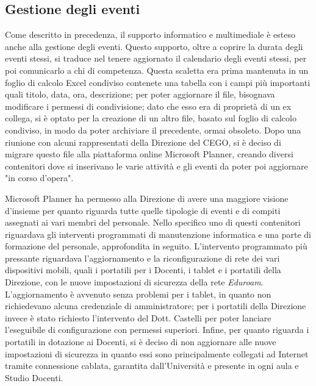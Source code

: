             \subsection{Gestione degli eventi}
                \par
                    Come descritto in precedenza, il supporto informatico e multimediale è esteso anche alla gestione degli eventi. Questo supporto, oltre a coprire la durata degli eventi stessi, si traduce nel tenere aggiornato il calendario degli eventi stessi, per poi comunicarlo a chi di competenza. Questa scaletta era prima mantenuta in un foglio di calcolo Excel condiviso contenete una tabella con i campi più importanti quali titolo, data, ora, descrizione; per poter aggiornare il file, bisognava modificare i permessi di condivisione; dato che esso era di proprietà di un ex collega, si è optato per la creazione di un altro file, basato sul foglio di calcolo condiviso, in modo da poter archiviare il precedente, ormai obsoleto. \newline
                    Dopo una riunione con alcuni rappresentati della Direzione del CEGO, si è deciso di migrare questo file alla piattaforma online Microsoft Planner, creando diversi contenitori dove si inserivano le varie attività e gli eventi da poter poi aggiornare "in corso d'opera".
                \par 
                    Microsoft Planner ha permesso alla Direzione di avere una maggiore visione d'insieme per quanto riguarda tutte quelle tipologie di eventi e di compiti assegnati ai vari membri del personale. Nello specifico uno di questi contenitori riguardava gli interventi programmati di manutenzione informatica e una parte di formazione del personale, approfondita in seguito. 
                    L'intervento programmato più pressante riguardava l'aggiornamento e la riconfigurazione di rete dei vari dispositivi mobili, quali i portatili per i Docenti, i tablet e i portatili della Direzione, con le nuove impostazioni di sicurezza della rete \textsl{Eduroam}. \newline
                    L'aggiornamento è avvenuto senza problemi per i tablet, in quanto non richiedevano alcuna credenziale di amministratore; per i portatili della Direzione invece è stato richiesto l'intervento del Dott. Castelli per poter lanciare l'eseguibile di configurazione con permessi superiori. Infine, per quanto riguarda i portatili in dotazione ai Docenti, si è deciso di non aggiornare alle nuove impostazioni di sicurezza in quanto essi sono principalmente collegati ad Internet tramite connessione cablata, garantita dall'Università e presente in ogni aula e Studio Docenti. 
